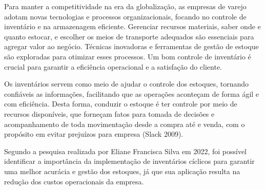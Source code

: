 
Para manter a competitividade na era da globalização, as empresas de varejo adotam novas 
tecnologias e processos organizacionais, focando no controle de inventário e na armazenagem 
eficiente. Gerenciar recursos materiais, saber onde e quanto estocar, e escolher os meios 
de transporte adequados são essenciais para agregar valor ao negócio. Técnicas inovadoras 
e ferramentas de gestão de estoque são exploradas para otimizar esses processos. Um bom 
controle de inventário é crucial para garantir a eficiência operacional e a satisfação do
cliente.

Os inventários servem como meio de ajudar o controle dos estoques, tornando
confiáveis as informações, facilitando que as operações aconteçam de forma ágil e com
eficiência. Desta forma, conduzir o estoque é ter controle por meio de recursos
disponíveis, que forneçam fatos para tomada de decisões e acompanhamento de toda
movimentação desde a compra até e venda, com o propósito em evitar prejuízos para
empresa (Slack 2009).

Segundo a pesquisa realizada por Eliane Francisca Silva em 2022, foi possível 
identificar a importância da implementação de inventários cíclicos para garantir 
uma melhor acurácia e gestão dos estoques, já que sua aplicação resulta na redução 
dos custos operacionais da empresa.

